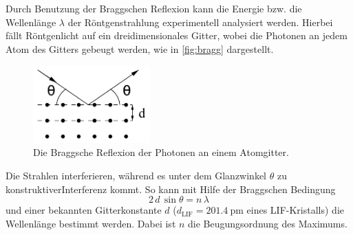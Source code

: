 Durch Benutzung der Braggschen Reflexion kann die Energie bzw. die Wellenlänge $\lambda$ der Röntgenstrahlung experimentell analysiert werden. 
Hierbei fällt Röntgenlicht auf ein dreidimensionales Gitter, wobei die Photonen an jedem Atom des Gitters gebeugt werden, wie in \autoref{fig:bragg} dargestellt.
\begin{figure}[H]
    \centering
    \includegraphics[width=0.4\textwidth]{pictures/bragg.pdf}
    \caption{Die Braggsche Reflexion der Photonen an einem Atomgitter. \cite{v602}}
    \label{fig:bragg}
\end{figure}
Die Strahlen interferieren, während es unter dem Glanzwinkel $\theta$ zu konstruktiverInterferenz kommt. 
So kann mit Hilfe der Braggschen Bedingung
\begin{equation}
    2 \, d \, \sin \theta = n \, \lambda
\end{equation}
und einer bekannten Gitterkonstante $d$ ($d_\text{LIF} = \qty{201.4}{\pico\meter}$ eines LIF-Kristalls) die Wellenlänge bestimmt werden.
Dabei ist $n$ die Beugungsordnung des Maximums.